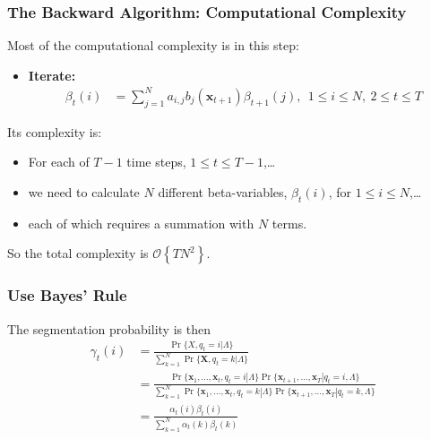 \documentclass{beamer}
\begin{document}
  
\begin{frame}
  \frametitle{The Backward Algorithm: Computational Complexity}

  Most of the computational complexity is in this step:
  \begin{itemize}
  \item {\bf Iterate:}
    \begin{align*}
      \beta_{t}(i) 
      &= \sum_{j=1}^N a_{i,j}b_j(\mathbf{x}_{t+1})\beta_{t+1}(j),~~1\le i\le N,~2\le t\le T
    \end{align*}
  \end{itemize}
  Its complexity is:
  \begin{itemize}
  \item For each of $T-1$ time steps, $1\le t\le T-1$,\ldots
  \item we need to calculate $N$ different beta-variables, $\beta_t(i)$, for $1\le i\le N$,\ldots
  \item each of which requires a summation with $N$ terms.
  \end{itemize}
  So the total complexity is ${\mathcal O}\left\{TN^2\right\}$.
\end{frame}

\begin{frame}
  \frametitle{Use Bayes' Rule}

  The segmentation probability is then
  \begin{align*}
    \gamma_t(i) &= \frac{\Pr\{X,q_t=i|\Lambda\}}{\sum_{k=1}^N \Pr\{\mathbf{X},q_t=k|\Lambda\}}\\
    &= \frac{\Pr\{\mathbf{x}_1,\ldots,\mathbf{x}_t,q_t=i|\Lambda\}\Pr\{\mathbf{x}_{t+1},\ldots,\mathbf{x}_T|q_t=i,\Lambda\}}{\sum_{k=1}^N \Pr\{\mathbf{x}_1,\ldots,\mathbf{x}_t,q_t=k|\Lambda\}\Pr\{\mathbf{x}_{t+1},\ldots,\mathbf{x}_T|q_t=k,\Lambda\}}\\
    &= \frac{\alpha_t(i)\beta_t(i)}{\sum_{k=1}^N\alpha_t(k)\beta_t(k)}
  \end{align*}
\end{frame}
\end{document}

